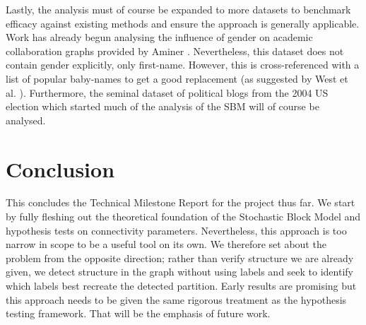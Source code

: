 \documentclass[11pt]{article}
\begin{document}
\begin{multicols*}{2}
Lastly, the analysis must of course be expanded to more datasets to benchmark efficacy against existing methods and ensure the approach is generally applicable. Work has already begun analysing the influence of gender on academic collaboration graphs provided by Aminer \cite{aminer}. Nevertheless, this dataset does not contain gender explicitly, only first-name. However, this is cross-referenced with a list of popular baby-names to get a good replacement (as suggested by West et al. \cite{gender-scholarship}). Furthermore, the seminal dataset of political blogs from the 2004 US election \cite{polblogs} which started much of the analysis of the SBM will of course be analysed.

\section{Conclusion}

This concludes the Technical Milestone Report for the project thus far. We start by fully fleshing out the theoretical foundation of the Stochastic Block Model and hypothesis tests on connectivity parameters. Nevertheless, this approach is too narrow in scope to be a useful tool on its own. We therefore set about the problem from the opposite direction; rather than verify structure we are already given, we detect structure in the graph without using labels and seek to identify which labels best recreate the detected partition. Early results are promising but this approach needs to be given the same rigorous treatment as the hypothesis testing framework. That will be the emphasis of future work.

\printbibliography

\end{multicols*}
\end{document}

